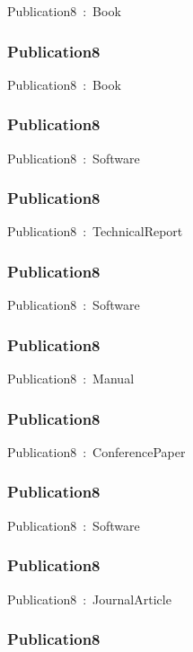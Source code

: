 \documentclass{article}
\begin{document}
Publication8~:~Book

\subsubsection*{Publication8}

Publication8~:~Book

\subsubsection*{Publication8}

Publication8~:~Software

\subsubsection*{Publication8}

Publication8~:~TechnicalReport

\subsubsection*{Publication8}

Publication8~:~Software

\subsubsection*{Publication8}

Publication8~:~Manual

\subsubsection*{Publication8}

Publication8~:~ConferencePaper

\subsubsection*{Publication8}

Publication8~:~Software

\subsubsection*{Publication8}

Publication8~:~JournalArticle

\subsubsection*{Publication8}
\end{document}
